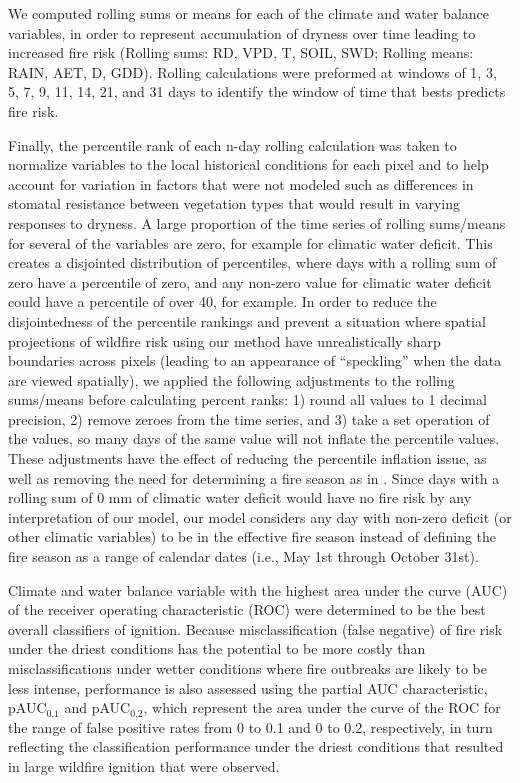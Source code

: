 \documentclass[11pt]{article}
\begin{document}
We computed rolling sums or means for each of the climate and water balance variables, in order to represent accumulation of dryness over time leading to increased fire risk (Rolling sums: RD, VPD, T, SOIL, SWD; Rolling means: RAIN, AET, D, GDD).  Rolling calculations were preformed at windows of 1, 3, 5, 7, 9, 11, 14, 21, and 31 days to identify the window of time that bests predicts fire risk.

Finally, the percentile rank of each n-day rolling calculation was taken to normalize variables to the local historical conditions for each pixel and to help account for variation in factors that were not modeled such as differences in stomatal resistance between vegetation types that would result in varying responses to dryness.  A large proportion of the time series of rolling sums/means for several of the variables are zero, for example for climatic water deficit.  This creates a disjointed distribution of percentiles, where days with a rolling sum of zero have a percentile of zero, and any non-zero value for climatic water deficit could have a percentile of over 40, for example.  In order to reduce the disjointedness of the percentile rankings and prevent a situation where spatial projections of wildfire risk using our method have unrealistically sharp boundaries across pixels (leading to an appearance of ``speckling'' when the data are viewed spatially), we applied the following adjustments to the rolling sums/means before calculating percent ranks: 1) round all values to 1 decimal precision, 2) remove zeroes from the time series, and 3) take a set operation of the values, so many days of the same value will not inflate the percentile values. These adjustments have the effect of reducing the percentile inflation issue, as well as removing the need for determining a fire season as in \citet{thomaWaterBalanceIndicator2020}.  Since days with a rolling sum of 0 mm of climatic water deficit would have no fire risk by any interpretation of our model, our model considers any day with non-zero deficit (or other climatic variables) to be in the effective fire season instead of defining the fire season as a range of calendar dates (i.e., May 1st through October 31st).

Climate and water balance variable with the highest area under the curve (AUC) of the receiver operating characteristic (ROC)  were determined to be the best overall classifiers of ignition.  Because misclassification (false negative) of fire risk under the driest conditions has the potential to be more costly than misclassifications under wetter conditions where fire outbreaks are likely to be less intense, performance is also assessed using the partial AUC characteristic, pAUC$_{0.1}$ and pAUC$_{0.2}$, which represent the area under the curve of the ROC for the range of false positive rates from 0 to 0.1 and 0 to 0.2, respectively, in turn reflecting the classification performance under the driest conditions that resulted in large wildfire ignition that were observed.   
\end{document}
